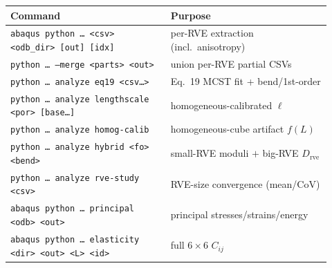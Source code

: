 \documentclass[11pt]{article}
\newcommand{\code}[1]{\texttt{\small #1}}
\begin{document}
\begin{center}
\begin{tabular}{@{}>{\raggedright\arraybackslash}p{0.46\linewidth} >{\raggedright\arraybackslash}p{0.46\linewidth}@{}}
\toprule
\textbf{Command} & \textbf{Purpose}\\
\midrule
\code{abaqus python \dots\ <csv> <odb\_dir> [out] [idx]} & per-RVE extraction (incl.\ anisotropy)\\
\code{python \dots\ --merge <parts> <out>} & union per-RVE partial CSVs\\
\code{python \dots\ analyze eq19 <csv\ldots>} & Eq.~19 MCST fit + bend/1st-order\\
\code{python \dots\ analyze lengthscale <por> [base\ldots]} & homogeneous-calibrated $\ell$\\
\code{python \dots\ analyze homog-calib} & homogeneous-cube artifact $f(L)$\\
\code{python \dots\ analyze hybrid <fo> <bend>} & small-RVE moduli $+$ big-RVE $D_\text{rve}$\\
\code{python \dots\ analyze rve-study <csv>} & RVE-size convergence (mean/CoV)\\
\code{abaqus python \dots\ principal <odb> <out>} & principal stresses/strains/energy\\
\code{abaqus python \dots\ elasticity <dir> <out> <L> <id>} & full $6\times6$ $C_{ij}$\\
\bottomrule
\end{tabular}
\end{center}

\end{document}
